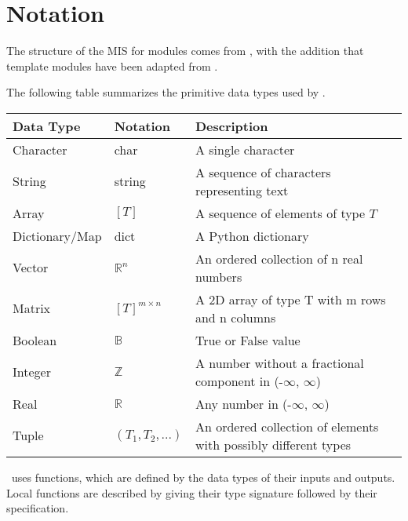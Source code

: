 \documentclass[12pt, titlepage]{article}
\begin{document}
\section{Notation}

The structure of the MIS for modules comes from \citet{HoffmanAndStrooper1995},
with the addition that template modules have been adapted from
\cite{GhezziEtAl2003}.

The following table summarizes the primitive data types used by \progname. 

\begin{center}
\renewcommand{\arraystretch}{1.2}
\noindent 
\begin{tabular}{l l p{7.5cm}} 
\toprule 
\textbf{Data Type} & \textbf{Notation} & \textbf{Description}\\ 
\midrule
Character & char & A single character\\
String & string & A sequence of characters representing text\\
Array & $[T]$ & A sequence of elements of type $T$\\
Dictionary/Map & dict & A Python dictionary\\
Vector & $\mathbb{R}^n$ & An ordered collection of n real numbers\\
Matrix &$[T]^{m\times n}$ & A 2D array of type T with m rows and n columns\\
Boolean & $\mathbb{B}$ & True or False value\\
Integer & $\mathbb{Z}$ & A number without a fractional component in (-$\infty$, $\infty$) \\
Real & $\mathbb{R}$ & Any number in (-$\infty$, $\infty$)\\
Tuple & $(T_1, T_2, ...)$ & An ordered collection of elements with possibly different types\\
\bottomrule
\end{tabular} 
\end{center}

\noindent
\progname \ uses functions, which
are defined by the data types of their inputs and outputs. Local functions are
described by giving their type signature followed by their specification.
\end{document}
